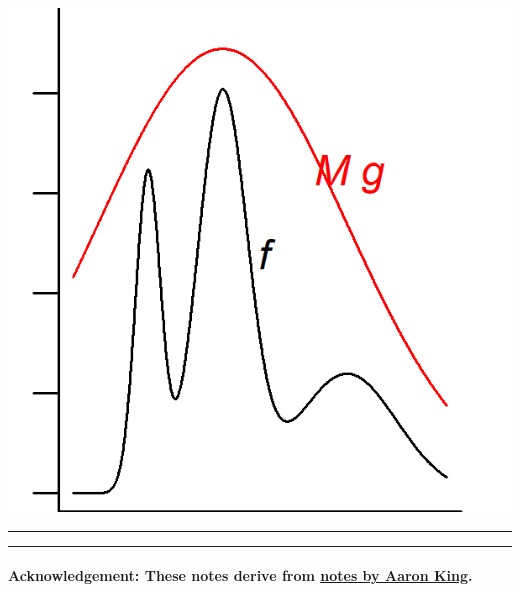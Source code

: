 \documentclass[]{article}
\let\oldparagraph\paragraph
\renewcommand{\paragraph}[1]{\oldparagraph{#1}\mbox{}}
\begin{document}
\begin{center}\includegraphics{figure/monteCarlo-rejection-method-diagram-1} \end{center}

\begin{center}\rule{0.5\linewidth}{\linethickness}\end{center}

\begin{center}\rule{0.5\linewidth}{\linethickness}\end{center}

\paragraph{\texorpdfstring{Acknowledgement: These notes derive from
\href{http://kingaa.github.io/sbied/pfilter/monteCarlo.html}{notes by
Aaron
King}.}{Acknowledgement: These notes derive from notes by Aaron King.}}\label{acknowledgement-these-notes-derive-from-notes-by-aaron-king.}
\end{document}
